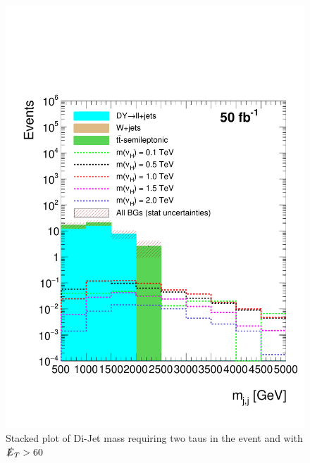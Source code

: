 \begin{figure}[H]
\centering
\includegraphics[width=\linewidth]{StackPlots/mjj_2Taus_met60_50ifb_2moreSignals.pdf}
\caption{Stacked plot of Di-Jet mass requiring two taus in the event and with $\slashed{E}_{T} > 60$}
\label{fig: mjj2tauMet60}
\end{figure}

